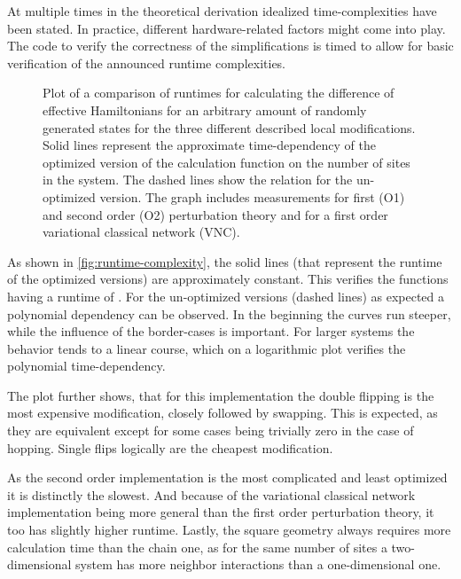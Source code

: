 At multiple times in the theoretical derivation idealized time-complexities have been stated.
In practice, different hardware-related factors might come into play.
The code to verify the correctness of the simplifications is timed to allow for basic verification of the announced runtime complexities.

\begin{figure}[htbp]
    \centering
    \vspace{-0.7cm}
    \caption{
            Plot of a comparison of runtimes for calculating the difference of effective Hamiltonians for an arbitrary amount of randomly generated states for the three different described local modifications. 
            Solid lines represent the approximate time-dependency of the optimized version of the calculation function on the number of sites in the system.
            The dashed lines show the relation for the un-optimized version.
            The graph includes measurements for first (O1) and second order (O2) perturbation theory and for a first order variational classical network (VNC).
        }
    \label{fig:runtime-complexity}
\end{figure}

As shown in \autoref{fig:runtime-complexity}, the solid lines (that represent the runtime of the optimized versions) are approximately constant.
This verifies the functions having a runtime of . 
For the un-optimized versions (dashed lines) as expected a polynomial dependency can be observed.
In the beginning the curves run steeper, while the influence of the border-cases is important. 
For larger systems the behavior tends to a linear course, which on a logarithmic plot verifies the polynomial time-dependency.

The plot further shows, that for this implementation the double flipping is the most expensive modification, closely followed by swapping.
This is expected, as they are equivalent except for some cases being trivially zero in the case of hopping.
Single flips logically are the cheapest modification.

As the second order implementation is the most complicated and least optimized it is distinctly the slowest.
And because of the variational classical network implementation being more general than the first order perturbation theory, it too has slightly higher runtime.
Lastly, the square geometry always requires more calculation time than the chain one, as for the same number of sites a two-dimensional system has more neighbor interactions than a one-dimensional one.